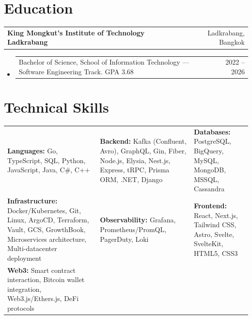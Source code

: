 \documentclass[letterpaper,9pt]{extarticle}
\makeatletter
\newcommand{\entry}[2]{%
  \vspace{0.6ex}%
  \noindent\begin{tabularx}{\textwidth}{@{}X r@{}}
    \textbf{#1} & #2 \\
  \end{tabularx}%
  \vspace{-0.2ex}%
}
\makeatother
\begin{document}
\section{Education}

\entry{King Mongkut's Institute of Technology Ladkrabang}{Ladkrabang, Bangkok}
\begin{itemize}
  \item \begin{tabularx}{\linewidth}{@{}X r@{}}
      Bachelor of Science, School of Information Technology --- Software Engineering Track. GPA 3.68 & 2022 -- 2026 \\
    \end{tabularx}
\end{itemize}

\section{Technical Skills}

\vspace{0.4ex}
\begin{tabularx}{\textwidth}{@{}S @{\hspace{1.4em}} S @{\hspace{1.4em}} S@{}}
  \textbf{Languages:} Go, TypeScript, SQL, Python, JavaScript, Java, C\#, C++ &
  \textbf{Backend:} Kafka (Confluent, Avro), GraphQL, Gin, Fiber, Node.js, Elysia, Nest.js, Express, tRPC, Prisma ORM, .NET, Django &
  \textbf{Databases:} PostgreSQL, BigQuery, MySQL, MongoDB, MSSQL, Cassandra \\[1.0ex]

  \textbf{Infrastructure:} Docker/Kubernetes, Git, Linux, ArgoCD, Terraform, Vault, GCS, GrowthBook, Microservices architecture, Multi-datacenter deployment &
  \textbf{Observability:} Grafana, Prometheus/PromQL, PagerDuty, Loki &
  \textbf{Frontend:} React, Next.js, Tailwind CSS, Astro, Svelte, SvelteKit, HTML5, CSS3 \\[1.0ex]

  \textbf{Web3:} Smart contract interaction, Bitcoin wallet integration, Web3.js/Ethers.js, DeFi protocols \\
\end{tabularx}
\end{document}

